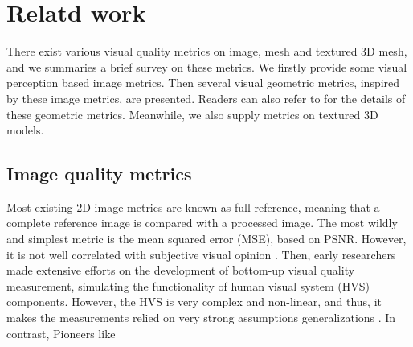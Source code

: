 \section{Relatd work}
There exist various visual quality metrics on image, mesh and textured 3D mesh, and we summaries a brief survey on these metrics. We firstly provide some visual perception based image metrics. Then several visual geometric metrics, inspired by these image metrics, are presented. Readers can also refer to \cite{Corsini_2013} for the details of these geometric metrics.  Meanwhile, we also supply metrics on textured 3D models. 
\subsection{Image quality metrics}
Most existing 2D image metrics are known as full-reference, meaning that a complete reference image is compared with a processed image.  The most wildly and simplest metric is the mean squared error (MSE), based on PSNR. However, it is not well correlated with subjective visual opinion \cite{Snyder_1985} \cite{Teo}. Then, early researchers \cite{Mannos_1974} made extensive efforts on the development of bottom-up visual quality measurement, simulating the functionality of human visual system (HVS) components. However, the HVS is very complex and non-linear, and thus, it makes the measurements relied on very strong assumptions generalizations \cite{Wang_2004}. In contrast, Pioneers like

